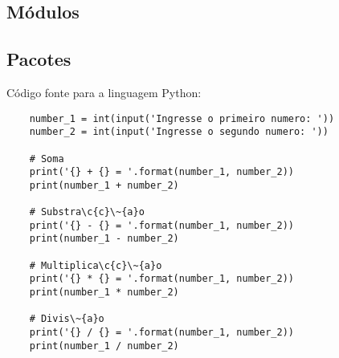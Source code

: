             \subsection{M\'{o}dulos}



            \subsection{Pacotes}






    C\'{o}digo fonte para a linguagem Python:
    \begin{lstlisting}
    number_1 = int(input('Ingresse o primeiro numero: '))
    number_2 = int(input('Ingresse o segundo numero: '))

    # Soma
    print('{} + {} = '.format(number_1, number_2))
    print(number_1 + number_2)

    # Substra\c{c}\~{a}o
    print('{} - {} = '.format(number_1, number_2))
    print(number_1 - number_2)

    # Multiplica\c{c}\~{a}o
    print('{} * {} = '.format(number_1, number_2))
    print(number_1 * number_2)

    # Divis\~{a}o
    print('{} / {} = '.format(number_1, number_2))
    print(number_1 / number_2)
    \end{lstlisting}





